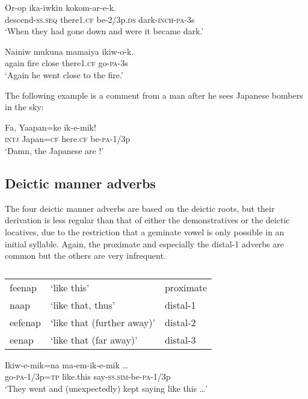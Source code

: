 \ea%
\label{ex:x1199}
\gll Or-op  ika-iwkin kokom-ar-e-k. \\
descend-\textsc{ss}.\textsc{seq} there1.\textsc{cf} be-2/3p.\textsc{ds} dark-\textsc{inch}-\textsc{pa}-3s\\
\glt`When they had gone down and were  it became dark.'
\z

\ea%
\label{ex:x1200}
\gll Nainiw mukuna mamaiya  ikiw-o-k. \\
again fire close there1.\textsc{cf} go-\textsc{pa}-3s\\
\glt`Again he went  close to the fire.'
\z

The following example is a comment from a man after he sees Japanese bombers in the sky:

\ea%
\label{ex:x1572}
\gll Fa, Yaapan=ke  ik-e-mik! \\
\textsc{intj} Japan=\textsc{cf} here.\textsc{cf} be-\textsc{pa}-1/3p\\
\glt`Damn, the Japanese are !'
\z

\subsection{Deictic manner adverbs}
{}
The four deictic manner adverbs are based on the deictic roots, but their derivation is less regular than that of either the demonstratives or the deictic locatives, due to the restriction that a geminate vowel is only possible in an initial syllable. Again, the proximate and especially the distal-1 adverbs are common but the others are very infrequent.

\begin{table}
\caption{}
\label{} 
\begin{tabular}{lll}
feenap &`like this' &proximate\\
naap &`like that, thus' &distal-1\\
eefenap &`like that (further away)' &distal-2\\
eenap &`like that (far away)' &distal-3\\
\end{tabular}
\end{table}


\ea%
\label{ex:x701}
\gll Ikiw-e-mik=na  ma-em-ik-e-mik {\dots} \\
go-\textsc{pa}-1/3p=\textsc{tp} like.this say-\textsc{ss}.\textsc{sim}-be-\textsc{pa}-1/3p\\
\glt`They went and (unexpectedly) kept saying like this {\dots}'
\z

